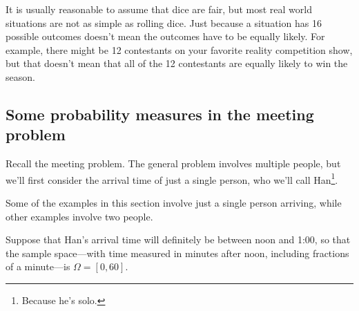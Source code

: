 \documentclass[
  letterpaper,
  DIV=11,
  numbers=noendperiod]{scrreprt}
\theoremstyle{plain}
\theoremstyle{definition}
\theoremstyle{definition}
\theoremstyle{definition}
\theoremstyle{remark}
\begin{document}
It is usually reasonable to assume that dice are fair, but most real
world situations are not as simple as rolling dice. Just because a
situation has 16 possible outcomes doesn't mean the outcomes have to be
equally likely. For example, there might be 12 contestants on your
favorite reality competition show, but that doesn't mean that all of the
12 contestants are equally likely to win the season.

\subsection{Some probability measures in the meeting
problem}\label{sec-meeting-probspace}

Recall the meeting problem. The general problem involves multiple
people, but we'll first consider the arrival time of just a single
person, who we'll call Han\footnote{Because he's solo.}.

\begin{tcolorbox}[enhanced jigsaw, opacityback=0, rightrule=.15mm, coltitle=black, colframe=quarto-callout-caution-color-frame, toprule=.15mm, colbacktitle=quarto-callout-caution-color!10!white, opacitybacktitle=0.6, left=2mm, toptitle=1mm, breakable, title={Caution}, bottomtitle=1mm, colback=white, leftrule=.75mm, titlerule=0mm, arc=.35mm, bottomrule=.15mm]

Some of the examples in this section involve just a single person
arriving, while other examples involve two people.

\end{tcolorbox}

Suppose that Han's arrival time will definitely be between noon and
1:00, so that the sample space---with time measured in minutes after
noon, including fractions of a minute---is \(\Omega = [0, 60]\).
\end{document}
